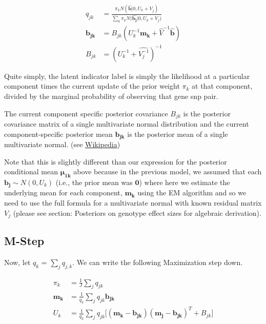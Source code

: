 \documentclass[11pt, oneside]{article}   	%
\begin{document}
\begin{equation}
\begin{align*}
q_{jk} &= \frac{\pi_{k} N (  \hat{\bm{b}} |0,U_{k}+V_{j})}{\sum_{k}{\pi_{k} N (\hat{\bm{b_{j}}}|0,U_{k}+V_{j}})} \\
\bm{b_{jk}} &=  B_{jk} (U_{k}^{-1} \bm{m_{k}}+\hat{V}^{-1}  \hat{\bm{b}}) \\
B_{jk}&=(U_{k}^{-1} + \hat{V_{j}^{-1}})^{-1}
\end{align*}
\end{equation}

Quite simply, the latent indicator label is simply the likelihood at a particular component times the current update of the prior weight $\pi_{k}$ at that component, divided by the marginal probability of observing that gene snp pair.

The current component specific posterior covariance $B_{jk}$ is the posterior covariance matrix of a single multivariate normal distribution and the current component-specific posterior mean $\bm{b_{jk}}$ is the posterior mean of a single multivariate normal. (see \href{http://en.wikipedia.org/wiki/Conjugate_prior#Continuous_distributions}{Wikipedia})

Note that this is slightly different than our expression for the posterior conditional mean $\bm{\mu_{1k}}$ above because in the previous model, we assumed that each $\bm{b_{j}} \sim N(0,U_{k})$ (i.e., the prior mean was $\bm{0}$) where here we estimate the underlying mean for each component, $\bm{m_{k}}$ using the EM algorithm and so we need to use the full formula for a multivariate normal with known residual matrix $V_{j}$ (please see section: Posteriors on genotype effect sizes for algebraic derivation).

\subsection{M-Step}
Now, let $q_{k}$ = $\sum_{j}{q_{j,k}}$. We can write the following Maximization step down.


\begin{equation}
\begin{align*}
\pi_{k} &= \frac{1}{J}\sum_{j} {q_{jk}}\\
\bm{m_{k}}&=\frac{1}{q_{k}}\sum_{j}{q_{jk} \bm{b_{jk}}}\\
U_{k} &= \frac{1}{q_{k}}\sum_{j} {q_{jk}[(\bm{m_{k}}-\bm{b_{jk}})(\bm{m_{j}}-\bm{b_{jk}})^{T}+B_{jk}}]
\end{align*}
\end{equation}
\end{document}
